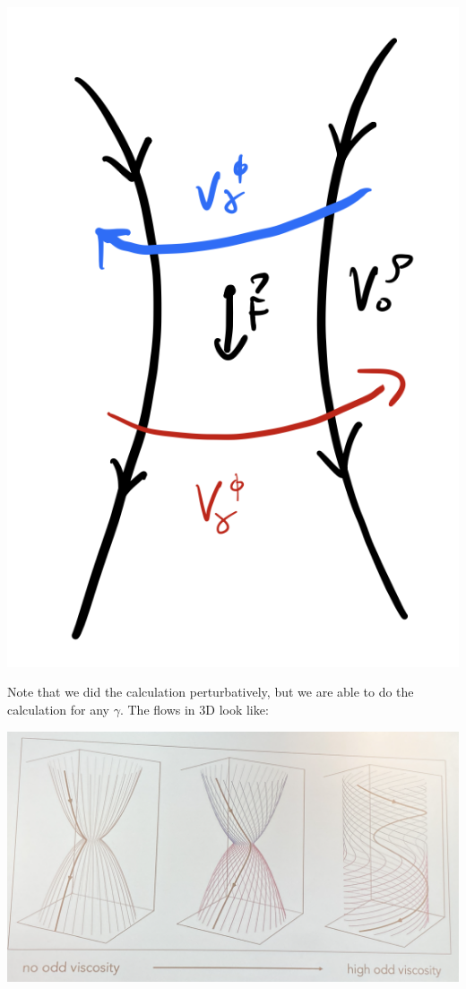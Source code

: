 \begin{center}
    \includegraphics[scale=0.35]{Lectures/Images/lec12-velocityfield.png}
\end{center}

Note that we did the calculation perturbatively, but we are able to do the calculation for any $\gamma$. The flows in 3D look like:

\begin{center}
    \includegraphics[scale=0.35]{Lectures/Images/lec12-velocityfieldstokeslet.png}
\end{center}


